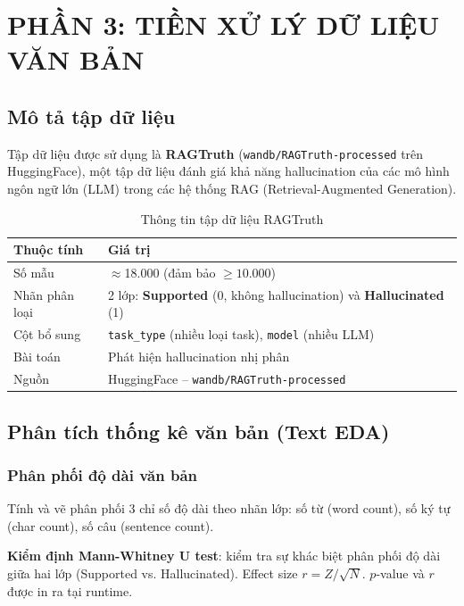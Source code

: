 \documentclass[12pt,a4paper]{article}
\let\oldtextbf\textbf
\renewcommand{\textbf}[1]{\oldtextbf{\textcolor{hcmublue}{#1}}}
\begin{document}
\section{PHẦN 3: TIỀN XỬ LÝ DỮ LIỆU VĂN BẢN}

\subsection{Mô tả tập dữ liệu}

Tập dữ liệu được sử dụng là \textbf{RAGTruth} (\texttt{wandb/RAGTruth-processed} trên HuggingFace), một tập dữ liệu đánh giá khả năng hallucination của các mô hình ngôn ngữ lớn (LLM) trong các hệ thống RAG (Retrieval-Augmented Generation).

\begin{table}[H]
\centering
\begin{tabular}{|l|l|}
\hline
\textbf{Thuộc tính} & \textbf{Giá trị} \\ \hline
Số mẫu & $\approx$18.000 (đảm bảo $\geq 10.000$) \\ \hline
Nhãn phân loại & 2 lớp: \textbf{Supported} (0, không hallucination) và \textbf{Hallucinated} (1) \\ \hline
Cột bổ sung & \texttt{task\_type} (nhiều loại task), \texttt{model} (nhiều LLM) \\ \hline
Bài toán & Phát hiện hallucination nhị phân \\ \hline
Nguồn & HuggingFace -- \texttt{wandb/RAGTruth-processed} \\ \hline
\end{tabular}
\caption{Thông tin tập dữ liệu RAGTruth}
\label{tab:text_dataset}
\end{table}

\subsection{Phân tích thống kê văn bản (Text EDA)}

\subsubsection{Phân phối độ dài văn bản}

Tính và vẽ phân phối 3 chỉ số độ dài theo nhãn lớp: số từ (word count), số ký tự (char count), số câu (sentence count).

\textbf{Kiểm định Mann-Whitney U test}: kiểm tra sự khác biệt phân phối độ dài giữa hai lớp (Supported vs. Hallucinated). Effect size $r = Z / \sqrt{N}$. $p$-value và $r$ được in ra tại runtime.
\end{document}

